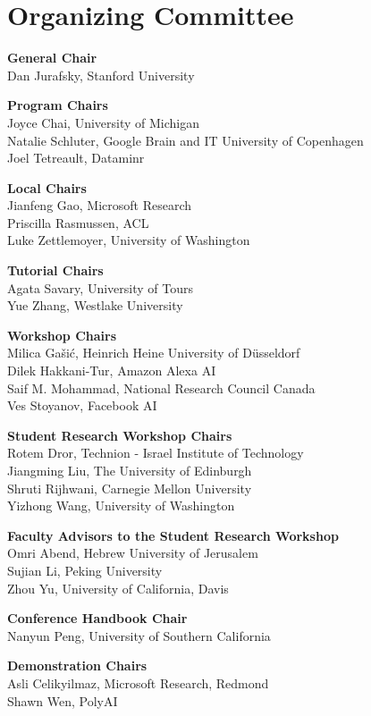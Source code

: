 \markboth{}{} %
\markright{}{} %
\newcommand{\aclitem}[1][]{{\bf #1}\\}

\section{Organizing Committee}{}

\setlength{\parindent}{0pt}

\aclitem[General Chair]
Dan Jurafsky, Stanford University

\aclitem[Program Chairs]
Joyce Chai, University of Michigan\\
Natalie Schluter, Google Brain and IT University of Copenhagen\\
Joel Tetreault, Dataminr

\aclitem[Local Chairs]
Jianfeng Gao, Microsoft Research\\
Priscilla Rasmussen, ACL\\
Luke Zettlemoyer, University of Washington

\aclitem[Tutorial Chairs]
Agata Savary, University of Tours\\
Yue Zhang, Westlake University

\aclitem[Workshop Chairs]
Milica Ga\v{s}i\'{c}, Heinrich Heine University of D\"{u}sseldorf\\
Dilek Hakkani-Tur, Amazon Alexa AI\\
Saif M. Mohammad, National Research Council Canada\\
Ves Stoyanov, Facebook AI

\aclitem[Student Research Workshop Chairs]
Rotem Dror, Technion - Israel Institute of Technology\\
Jiangming Liu, The University of Edinburgh\\
Shruti Rijhwani, Carnegie Mellon University\\
Yizhong Wang, University of Washington

\aclitem[Faculty Advisors to the Student Research Workshop]
Omri Abend, Hebrew University of Jerusalem\\
Sujian Li, Peking University\\
Zhou Yu, University of California, Davis

\aclitem[Conference Handbook Chair]
Nanyun Peng, University of Southern California

\aclitem[Demonstration Chairs]
Asli Celikyilmaz, Microsoft Research, Redmond\\
Shawn Wen, PolyAI

